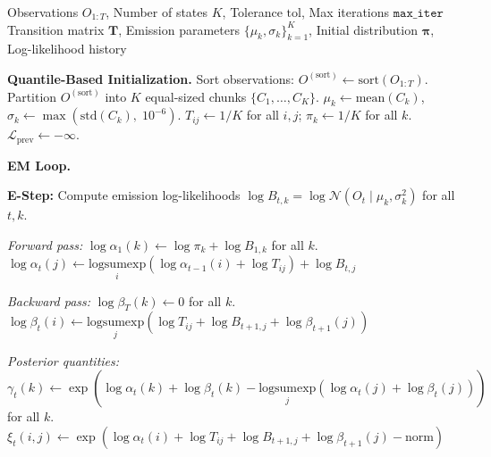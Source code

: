 \begin{algorithm}[tp]
\caption{Baum-Welch (EM) algorithm for continuous Gaussian HMM parameter estimation}
\label{alg:baum_welch}
\small
\begin{algorithmic}[1]
\REQUIRE Observations $O_{1:T}$, Number of states $K$, Tolerance $\text{tol}$, Max iterations $\texttt{max\_iter}$
\ENSURE Transition matrix $\mathbf{T}$, Emission parameters $\{\mu_k, \sigma_k\}_{k=1}^K$, Initial distribution $\boldsymbol{\pi}$, Log-likelihood history

\STATE \textbf{Quantile-Based Initialization.}
\STATE Sort observations: $O^{(\text{sort})} \leftarrow \text{sort}(O_{1:T})$.
\STATE Partition $O^{(\text{sort})}$ into $K$ equal-sized chunks $\{C_1, \ldots, C_K\}$.
    \STATE $\mu_k \leftarrow \text{mean}(C_k)$, \quad $\sigma_k \leftarrow \max(\text{std}(C_k),\; 10^{-6})$.
\ENDFOR
\STATE $T_{ij} \leftarrow 1/K$ for all $i, j$; \quad $\pi_k \leftarrow 1/K$ for all $k$.
\STATE $\mathcal{L}_{\text{prev}} \leftarrow -\infty$.

\STATE \textbf{EM Loop.}

    \STATE \textbf{E-Step:} Compute emission log-likelihoods $\log B_{t,k} = \log \mathcal{N}(O_t \mid \mu_k, \sigma_k^2)$ for all $t, k$.

    \STATE \textit{Forward pass:}
    \STATE $\log \alpha_1(k) \leftarrow \log \pi_k + \log B_{1,k}$ for all $k$.
            \STATE $\log \alpha_t(j) \leftarrow \underset{i}{\text{logsumexp}}\!\left(\log \alpha_{t-1}(i) + \log T_{ij}\right) + \log B_{t,j}$
        \ENDFOR
    \ENDFOR

    \STATE \textit{Backward pass:}
    \STATE $\log \beta_T(k) \leftarrow 0$ for all $k$.
            \STATE $\log \beta_t(i) \leftarrow \underset{j}{\text{logsumexp}}\!\left(\log T_{ij} + \log B_{t+1,j} + \log \beta_{t+1}(j)\right)$
        \ENDFOR
    \ENDFOR

    \STATE \textit{Posterior quantities:}
        \STATE $\gamma_t(k) \leftarrow \exp\!\left(\log \alpha_t(k) + \log \beta_t(k) - \underset{j}{\text{logsumexp}}(\log \alpha_t(j) + \log \beta_t(j))\right)$ for all $k$.
    \ENDFOR
                \STATE $\xi_t(i,j) \leftarrow \exp\!\left(\log \alpha_t(i) + \log T_{ij} + \log B_{t+1,j} + \log \beta_{t+1}(j) - \text{norm}\right)$
            \ENDFOR
        \ENDFOR
    \ENDFOR


\end{algorithmic}
\end{algorithm}
